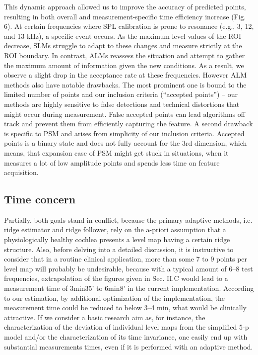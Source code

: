 \documentclass[journal,twoside,web]{ieeecolor2}
\begin{document}
This dynamic approach allowed us to improve the accuracy of predicted points, resulting in both overall and measurement-specific time efficiency increase (Fig. 6). At certain frequencies where SPL calibration is prone to resonance (e.g., 3, 12, and 13 kHz), a specific event occurs. As the maximum level values of the ROI decrease, SLMs struggle to adapt to these changes and measure strictly at the ROI boundary. In contrast, ALMs reassess the situation and attempt to gather the maximum amount of information given the new conditions. As a result, we observe a slight drop in the acceptance rate at these frequencies.
However ALM methods also have notable drawbacks. The most prominent one is bound to the limited number of points and our inclusion criteria (“accepted points”) – our methods are highly sensitive to false detections and technical distortions that might occur during measurement. False accepted points can lead algorithms off track and prevent them from efficiently capturing the feature. A second drawback is specific to PSM and arises from simplicity of our inclusion criteria. Accepted points is a binary state and does not fully account for the 3rd dimension, which means, that expansion case of PSM might get stuck in situations, when it measures a lot of low amplitude points and spends less time on feature acquisition.

\subsection{Time concern}
Partially, both goals stand in conflict, because the primary adaptive methods, i.e. ridge estimator and ridge follower, rely on the a-priori assumption that a physiologically healthy cochlea presents a level map having a certain ridge structure. Also, before delving into a detailed discussion, it is instructive to consider that in a routine clinical application, more than some 7 to 9 points per level map will probably be undesirable, because with a typical amount of 6–8 test frequencies, extrapolation of the figures given in Sec. II.C would lead to a measurement time of 3min35' to 6min8' in the current implementation. According to our estimation, by additional optimization of the implementation, the measurement time could be reduced to below 3–4 min, what would be clinically attractive. If we consider a basic research aim as, for instance, the characterization of the deviation of individual level maps from the simplified 5-p model and/or the characterization of its time invariance, one easily end up with substantial measurements times, even if it is performed with an adaptive method.
\end{document}
